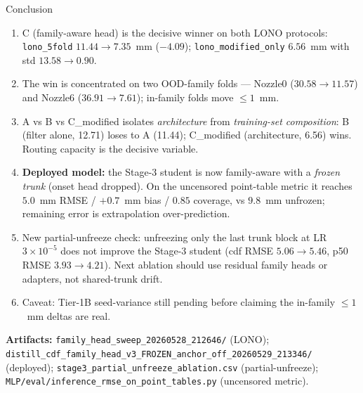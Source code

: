 \documentclass[UTF8,aspectratio=169]{ctexbeamer}
\newcommand{\good}[1]{\textcolor{green!45!black}{#1}}
\newcommand{\warn}[1]{\textcolor{red!65!black}{#1}}
\begin{document}
\begin{frame}{Conclusion}
\footnotesize
\begin{enumerate}\setlength\itemsep{2pt}
  \item C (family-aware head) is the decisive winner on both LONO protocols:
        \texttt{lono\_5fold} $11.44\!\to\!7.35$~mm ($-4.09$); \texttt{lono\_modified\_only}
        $6.56$~mm with std $13.58\!\to\!0.90$.
  \item The win is concentrated on two OOD-family folds --- Nozzle0
        ($30.58\!\to\!11.57$) and Nozzle6 ($36.91\!\to\!7.61$); in-family folds move
        $\leq 1$~mm.
  \item A vs B vs C\_modified isolates \emph{architecture} from \emph{training-set
        composition}: B (filter alone, 12.71) loses to A (11.44); C\_modified
        (architecture, 6.56) wins. Routing capacity is the decisive variable.
  \item \textbf{Deployed model:} the Stage-3 student is now family-aware with a
        \emph{frozen trunk} (onset head dropped). On the uncensored point-table metric
        it reaches \good{$5.0$~mm} RMSE / $+0.7$~mm bias / $0.85$ coverage, vs
        $9.8$~mm unfrozen; remaining error is extrapolation over-prediction.
  \item New partial-unfreeze check: unfreezing only the last trunk block at
        LR $3{\times}10^{-5}$ does \warn{not} improve the Stage-3 student
        (cdf RMSE $5.06\!\to\!5.46$, p50 RMSE $3.93\!\to\!4.21$). Next
        ablation should use residual family heads or adapters, not shared-trunk drift.
  \item Caveat: Tier-1B seed-variance still pending before claiming the in-family
        $\leq 1$~mm deltas are real.
\end{enumerate}

\vspace{0.2em}
\scriptsize
\textbf{Artifacts:}
\texttt{family\_head\_sweep\_20260528\_212646/} (LONO);
\texttt{distill\_cdf\_family\_head\_v3\_FROZEN\_anchor\_off\_20260529\_213346/} (deployed);
\texttt{stage3\_partial\_unfreeze\_ablation.csv} (partial-unfreeze);
\texttt{MLP/eval/inference\_rmse\_on\_point\_tables.py} (uncensored metric).
\end{frame}
\end{document}
